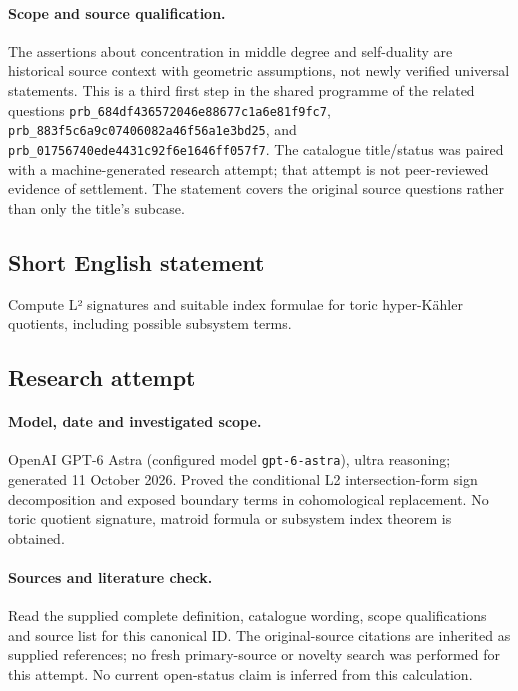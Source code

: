 \documentclass[11pt]{article}
\begin{document}
\paragraph{Scope and source qualification.}The assertions about concentration in middle degree and self-duality are historical source context with geometric assumptions, not newly verified universal statements. This is a third first step in the shared programme of the related questions \texttt{prb\_684df436572046e88677c1a6e81f9fc7}, \texttt{prb\_883f5c6a9c07406082a46f56a1e3bd25}, and \texttt{prb\_01756740ede4431c92f6e1646ff057f7}. The catalogue title/status was paired with a machine-generated research attempt; that attempt is not peer-reviewed evidence of settlement. The statement covers the original source questions rather than only the title’s subcase.
\subsection{Short English statement}
Compute L² signatures and suitable index formulae for toric hyper-Kähler quotients, including possible subsystem terms.
\subsection{Research attempt}
\paragraph{Model, date and investigated scope.}
OpenAI GPT-6 Astra (configured model \texttt{gpt-6-astra}), ultra reasoning; generated 11 October 2026. Proved the conditional L2 intersection-form sign decomposition and exposed boundary terms in cohomological replacement. No toric quotient signature, matroid formula or subsystem index theorem is obtained.

\paragraph{Sources and literature check.}
Read the supplied complete definition, catalogue wording, scope qualifications and source list for this canonical ID. The original-source citations are inherited as supplied references; no fresh primary-source or novelty search was performed for this attempt. No current open-status claim is inferred from this calculation.
\end{document}
